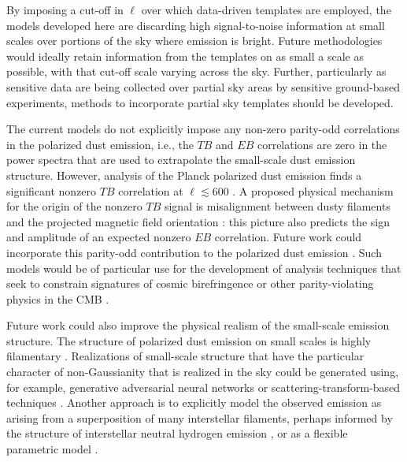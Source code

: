 \documentclass[twocolumn]{aastex631}
\begin{document}
By imposing a cut-off in $\ell$ over which data-driven templates are employed, the models developed here are discarding high signal-to-noise information at small scales over portions of the sky where emission is bright. Future methodologies would ideally retain information from the templates on as small a scale as possible, with that cut-off scale varying across the sky. Further, particularly as sensitive data are being collected over partial sky areas by sensitive ground-based experiments, methods to incorporate partial sky templates should be developed.

The current models do not explicitly impose any non-zero parity-odd correlations in the polarized dust emission, i.e., the $TB$ and $EB$ correlations are zero in the power spectra that are used to extrapolate the small-scale dust emission structure. However, analysis of the Planck polarized dust emission finds a significant nonzero $TB$ correlation at $\ell \lesssim 600$ \citep{planck2016-l11A, Weiland:2020}. A proposed physical mechanism for the origin of the nonzero $TB$ signal is misalignment between dusty filaments and the projected magnetic field orientation \citep{Huffenberger:2020, Clark:2021, Cukierman:2023}: this picture also predicts the sign and amplitude of an expected nonzero $EB$ correlation. Future work could incorporate this parity-odd contribution to the polarized dust emission \citep[e.g.,][]{Hervias-Caimapo:2024}. Such models would be of particular use for the development of analysis techniques that seek to constrain signatures of cosmic birefringence or other parity-violating physics in the CMB \citep[e.g.,][]{Choi:2020, Minami:2020, Eskilt:2022}.

Future work could also improve the physical realism of the small-scale emission structure. The structure of polarized dust emission on small scales is highly filamentary \citep[e.g.,][]{Clark:2015, Halal:2024b}. Realizations of small-scale structure that have the particular character of non-Gaussianity that is realized in the sky could be generated using, for example, generative adversarial neural networks \citep{Krachmalnicoff:2021, Yao:2024} or scattering-transform-based techniques \citep{Regaldo-SaintBlancard:2020}. Another approach is to explicitly model the observed emission as arising from a superposition of many interstellar filaments, perhaps informed by the structure of interstellar neutral hydrogen emission \citep{Clark:2019}, or as a flexible parametric model \citep{Hervias-Caimapo:2022}.
\end{document}
